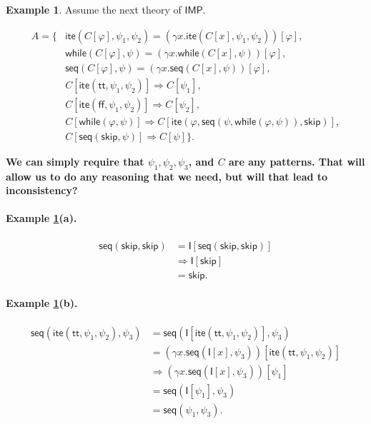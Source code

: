 \documentclass[UTF8]{article}
\newcommand{\comment}[1]
    {\par {\bfseries \color{blue} #1 \par}} %
\newcounter{thmcounter}
\theoremstyle{plain}
\theoremstyle{definition}
\newtheorem{example}[thmcounter]{Example}
\theoremstyle{remark}
\newcommand{\IMP}{\mathsf{IMP}}
\newcommand{\impite}{\mathsf{ite}}
\newcommand{\impwhile}{\mathsf{while}}
\newcommand{\imptt}{\mathsf{tt}}
\newcommand{\impff}{\mathsf{ff}}
\newcommand{\impskip}{\mathsf{skip}}
\newcommand{\impseq}{\mathsf{seq}}
\newcommand{\I}{\mathsf{I}}
\begin{document}
\begin{example} Assume the next theory of $\IMP$.
\label{example:IMP}

\begin{align*}
  A = \{&\impite(C[\varphi], \psi_1, \psi_2) = (\gamma x . \impite(C[x], \psi_1, \psi_2))[\varphi], \\
        &\impwhile(C[\varphi], \psi) = (\gamma x . \impwhile(C[x], \psi))[\varphi], \\
        &\impseq(C[\varphi], \psi) = (\gamma x . \impseq(C[x], \psi))[\varphi], \\
        &C[\impite(\imptt, \psi_1, \psi_2)] \Rightarrow C[\psi_1], \\
        &C[\impite(\impff, \psi_1, \psi_2)] \Rightarrow C[\psi_2], \\
        &C[\impwhile(\varphi, \psi)] \Rightarrow C[\impite(\varphi, \impseq(\psi, \impwhile(\varphi, \psi)), \impskip)], \\
        &C[\impseq(\impskip,\psi)] \Rightarrow C[\psi] \}.
\end{align*}

\comment{We can simply require that $\psi_1, \psi_2, \psi_3$, and $C$ are any patterns. That will allow us to do any reasoning that we need, but will that lead to inconsistency?}

\paragraph{Example \ref{example:IMP}(a).} 
	\begin{align*}
	\impseq(\impskip,\impskip)
	&= \mathsf{I}[\impseq(\impskip,\impskip)] \\
	&\Rightarrow \mathsf{I}[\impskip] \\
	&= \impskip.
	\end{align*}
	
\paragraph{Example \ref{example:IMP}(b).} 
	\begin{align*}
	\impseq(\impite(\imptt, \psi_1, \psi_2), \psi_3) 
	&= \impseq(\I[\impite(\imptt, \psi_1, \psi_2)], \psi_3) \\
	&= (\gamma x . \impseq(\I[x], \psi_3))[\impite(\imptt, \psi_1, \psi_2)] \\
	&\Rightarrow (\gamma x . \impseq(\I[x], \psi_3))[\psi_1] \\
	&= \impseq(\I[\psi_1], \psi_3) \\
	&= \impseq(\psi_1, \psi_3).
	\end{align*}
\end{example}
\end{document}
